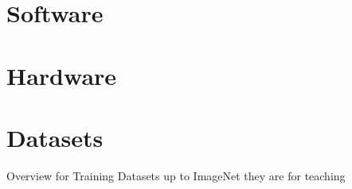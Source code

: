 \section{Software}
\section{Hardware}
\section{Datasets}
\textbullet Overview for Training Datasets up to ImageNet they are for teaching